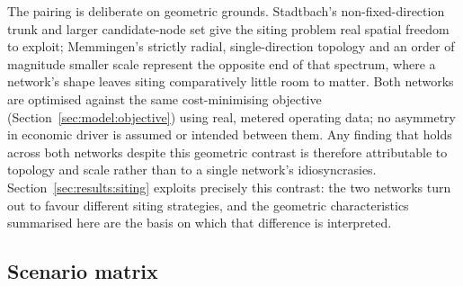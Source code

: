 \documentclass[review,3p]{elsarticle}
\begin{document}
The pairing is deliberate on geometric grounds. Stadtbach's
non-fixed-direction trunk and larger candidate-node set give the siting
problem real spatial freedom to exploit; Memmingen's strictly radial,
single-direction topology and an order of magnitude smaller scale
represent the opposite end of that spectrum, where a network's shape
leaves siting comparatively little room to matter. Both networks are
optimised against the same cost-minimising objective
(Section~\ref{sec:model:objective}) using real, metered operating data;
no asymmetry in economic driver is assumed or intended between them.
Any finding that holds across both networks despite this geometric
contrast is therefore attributable to topology and scale rather than to
a single network's idiosyncrasies. Section~\ref{sec:results:siting}
exploits precisely this contrast: the two networks turn out to favour
different siting strategies, and the geometric characteristics
summarised here are the basis on which that difference is interpreted.

\subsection{Scenario matrix}
\label{sec:cases:scenarios}
\end{document}
